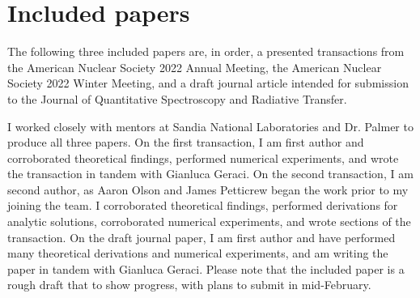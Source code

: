 \chapter{Included papers} \label{appA}
The following three included papers are, in order, a presented transactions from the American Nuclear Society 2022 Annual Meeting, the American Nuclear Society 2022 Winter Meeting, and a draft journal article intended for submission to the Journal of Quantitative Spectroscopy and Radiative Transfer.

I worked closely with mentors at Sandia National Laboratories and Dr. Palmer to produce all three papers. On the first transaction, I am first author and corroborated theoretical findings, performed numerical experiments, and wrote the transaction in tandem with Gianluca Geraci. On the second transaction, I am second author, as Aaron Olson and James Petticrew began the work prior to my joining the team. I corroborated theoretical findings, performed derivations for analytic solutions, corroborated numerical experiments, and wrote sections of the transaction. 
On the draft journal paper, I am first author and have performed many theoretical derivations and numerical experiments, and am writing the paper in tandem with Gianluca Geraci. Please note that the included paper is a rough draft that to show progress, with plans to submit in mid-February.




